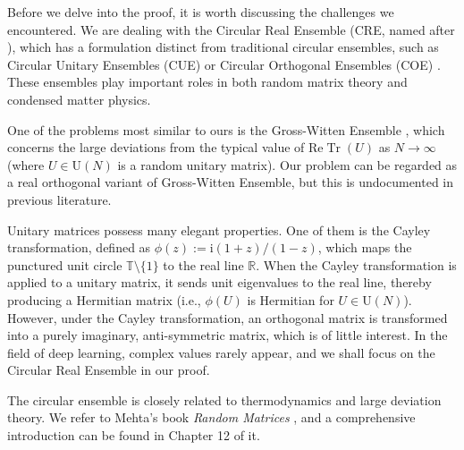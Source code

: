 \documentclass{article} %
\DeclareMathOperator{\Tr}{Tr}
\begin{document}
Before we delve into the proof, it is worth discussing the challenges we encountered. 
We are dealing with the Circular Real Ensemble (CRE, named after \citet{PhysRevLett.104.147001}), 
which has a formulation distinct from traditional circular ensembles, such as
Circular Unitary Ensembles (CUE) or Circular Orthogonal Ensembles (COE) \citep{Dyson1962}. 
These ensembles play important roles in both random matrix theory and condensed matter physics.

One of the problems most similar to ours is the Gross-Witten Ensemble \citep{GrossWitten1980,gamboa2017sumruleslargedeviations}, 
which concerns the large deviations from the typical value of $\mathrm{Re} \Tr (U)$ as $N \to \infty$
(where $U \in \mathrm{U}(N)$ is a random unitary matrix). Our problem can be regarded as a real orthogonal variant of Gross-Witten Ensemble, 
but this is undocumented in previous literature.

Unitary matrices possess many elegant properties. 
One of them is the Cayley transformation, defined as $\phi(z) := \mathrm{i}(1+z)/(1-z)$, 
which maps the punctured unit circle $\mathbb{T} \setminus \{1\}$ to the real line $\mathbb{R}$.
When the Cayley transformation is applied to a unitary matrix, it sends unit eigenvalues to the real line,
thereby producing a Hermitian matrix (i.e., $\phi(U)$ is Hermitian for $U \in \mathrm{U}(N)$).
However, under the Cayley transformation, an orthogonal matrix is transformed into 
a purely imaginary, anti-symmetric matrix, which is of little interest. 
In the field of deep learning, complex values rarely appear, and we shall focus on the Circular Real Ensemble 
in our proof.

The circular ensemble is closely related to thermodynamics and large deviation theory. 
We refer to Mehta's book \textit{Random Matrices} \citep{Mehta2004}, 
and a comprehensive introduction can be found in Chapter 12 of it.
\end{document}
